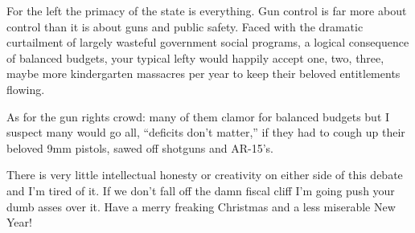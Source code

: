 For the left the primacy of the state is everything. Gun control is far
more about control than it is about guns and public safety. Faced with
the dramatic curtailment of largely wasteful government social programs,
a logical consequence of balanced budgets, your typical lefty would
happily accept one, two, three, maybe more kindergarten massacres per
year to keep their beloved entitlements flowing.

As for the gun rights crowd: many of them clamor for balanced budgets
but I suspect many would go all, ``deficits don't matter,'' if they had
to cough up their beloved 9mm pistols, sawed off shotguns and AR-15's.

There is very little intellectual honesty or creativity on either side
of this debate and I'm tired of it. If we don't fall off the damn fiscal
cliff I'm going push your dumb asses over it. Have a merry freaking
Christmas and a less miserable New Year!


%